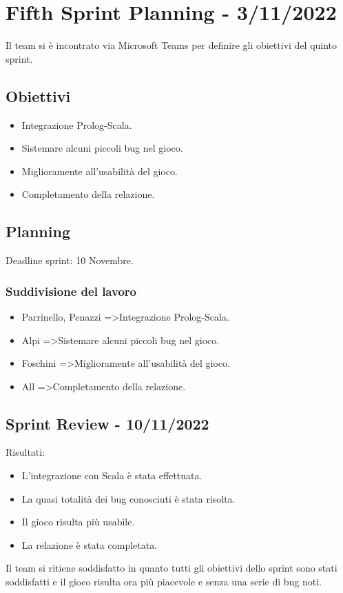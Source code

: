 \section*{Fifth Sprint Planning - 3/11/2022}
Il team si è incontrato via Microsoft Teams per definire gli obiettivi del quinto sprint.

\subsection*{Obiettivi}
\begin{itemize}
    \item Integrazione Prolog-Scala.
    \item Sistemare alcuni piccoli bug nel gioco.
    \item Miglioramente all'usabilità del gioco.
    \item Completamento della relazione.
\end{itemize}

\subsection*{Planning}
Deadline sprint: 10 Novembre.

\subsubsection*{Suddivisione del lavoro}
\begin{itemize}
    \item Parrinello, Penazzi =\textgreater  Integrazione Prolog-Scala.
    \item Alpi =\textgreater  Sistemare alcuni piccoli bug nel gioco.
    \item Foschini =\textgreater  Miglioramente all'usabilità del gioco.
    \item All =\textgreater  Completamento della relazione.
\end{itemize}

\subsection*{Sprint Review - 10/11/2022}
Risultati:
\begin{itemize}
    \item L'integrazione con Scala è stata effettuata.
    \item La quasi totalità dei bug conosciuti è stata risolta.
    \item Il gioco risulta più usabile.
    \item La relazione è stata completata.
\end{itemize}
Il team si ritiene soddisfatto in quanto tutti gli obiettivi dello sprint sono stati soddisfatti e il
gioco risulta ora più piacevole e senza una serie di bug noti.